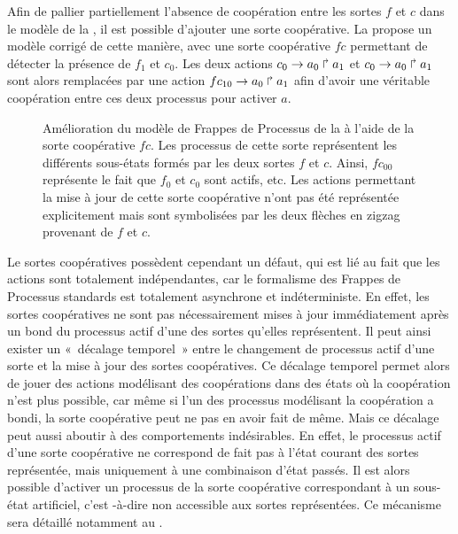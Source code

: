 \begin{example}
  Afin de pallier partiellement l'absence de coopération entre les sortes $f$ et $c$
  dans le modèle de la ,
  il est possible d'ajouter une sorte coopérative.
  La  propose un modèle corrigé de cette manière,
  avec une sorte coopérative $fc$ permettant de détecter la présence de $f_1$ et $c_0$.
  Les deux actions $c_0\rightarrow a_0\Rsh a_1$ et $c_0\rightarrow a_0\Rsh a_1$
  sont alors remplacées par une action $fc_{10}\rightarrow a_0\Rsh a_1$
  afin d'avoir une véritable coopération entre ces deux processus pour activer $a$.
  
  \begin{figure}[ht]
  \begin{center}
  \caption{%
    Amélioration du modèle de Frappes de Processus de la 
    à l'aide de la sorte coopérative $fc$.
    Les processus de cette sorte représentent les différents sous-états formés par les
    deux sortes $f$ et $c$.
    Ainsi, $fc_{00}$ représente le fait que $f_0$ et $c_0$ sont actifs, etc.
    Les actions permettant la mise à jour de cette sorte coopérative n'ont pas
    été représentée explicitement mais sont symbolisées par les deux flèches
    en zigzag provenant de $f$ et $c$.
  }
  \end{center}
  \end{figure}
\end{example}

\myskip

Le sortes coopératives possèdent cependant un défaut, qui est lié au fait que les actions
sont totalement indépendantes, car
le formalisme des Frappes de Processus standards est totalement asynchrone et indéterministe.
En effet, les sortes coopératives ne sont pas nécessairement mises à jour immédiatement
après un bond du processus actif d'une des sortes qu'elles représentent.
Il peut ainsi exister un «~décalage temporel~» entre le changement de processus actif
d'une sorte et la mise à jour des sortes coopératives.
Ce décalage temporel permet alors de jouer des actions modélisant des coopérations dans des états
où la coopération n'est plus possible,
car même si l'un des processus modélisant la coopération a bondi,
la sorte coopérative peut ne pas en avoir fait de même.
Mais ce décalage peut aussi aboutir à des comportements indésirables.
En effet, le processus actif d'une sorte coopérative ne correspond de fait pas à l'état courant
des sortes représentée, mais uniquement à une combinaison d'état passés.
Il est alors possible d'activer un processus de la sorte coopérative correspondant à
un sous-état artificiel,
c'est -à-dire non accessible aux sortes représentées.
Ce mécanisme sera détaillé notamment au .

